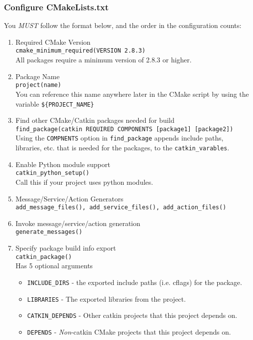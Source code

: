 \documentclass[12pt, a4paper, english]{article}
\begin{document}
\subsubsection{Configure CMakeLists.txt}
You \emph{MUST} follow the format below, and the order in the configuration counts:
\begin{enumerate}
  \item Required CMake Version \\
  \texttt{cmake\_minimum\_required(VERSION 2.8.3)}\\
  All packages require a minimum version of 2.8.3 or higher.
  \item Package Name \\
  \texttt{project(name)} \\
  You can reference this name anywhere later in the CMake script by using the variable \texttt{\$\{PROJECT\_NAME\}}
  \item Find other CMake/Catkin packages needed for build \\
  \texttt{find\_package(catkin REQUIRED COMPONENTS [package1] [package2])}\\
  Using the \texttt{COMPNENTS} option in \texttt{find\_package} appends include paths, libraries, etc. that is needed for the packages, to the \texttt{catkin\_varables}.
  \item Enable Python module support \\
  \texttt{catkin\_python\_setup()} \\
  Call this if your project uses python modules.
  \item Message/Service/Action Generators \\
  \texttt{add\_message\_files(), add\_service\_files(), add\_action\_files()}
  \item Invoke message/service/action generation \\
  \texttt{generate\_messages()}
  \item Specify package build info export \\
  \texttt{catkin\_package()}\\
  Has 5 optional arguments
  \begin{itemize}
    \item \texttt{INCLUDE\_DIRS} - the exported include paths (i.e. cflags) for the package.
    \item \texttt{LIBRARIES} - The exported libraries from the project.
    \item \texttt{CATKIN\_DEPENDS} - Other catkin projects that this project depends on.
    \item \texttt{DEPENDS} - \emph{Non}-catkin CMake projects that this project depends on.

\end{itemize}
\end{enumerate}
\end{document}
